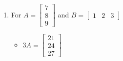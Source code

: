 \documentclass{ximera}
\begin{document}
\begin{enumerate}
\begin{multicols}{3}
\begin{itemize}
\item  $3A = \left[ \begin{array}{rr} 6 & 12 \\ 18 & 24 \end{array} \right]$

\item $-B = \left[ \begin{array}{rrr} 1 & -3 & 5 \\ -7 & 9 & -11 \end{array} \right]$

\item $A^2 = \left[ \begin{array}{rr} 28 & 40 \\ 60 & 88 \end{array} \right]$

\end{itemize}
\end{multicols}


\begin{multicols}{3}
\begin{itemize}
\item  $A-2B$ is not defined

\item $AB = \left[ \begin{array}{rrr} 26 & -30 & 34 \\ 50 & -54 & 58 \end{array} \right]$

\item $BA$ is not defined

\end{itemize}
\end{multicols}

\pagebreak

\item For $A = \left[ \begin{array}{r} 7 \\ 8 \\ 9 \end{array} \right]$ and $B=\left[ \begin{array}{rrr} 1 & 2 & 3 \end{array} \right]$

\begin{multicols}{2}
\begin{itemize}
\item  $3A = \left[ \begin{array}{r} 21 \\ 24 \\ 27 \end{array} \right]$


\end{itemize}
\end{multicols}
\end{enumerate}
\end{document}
